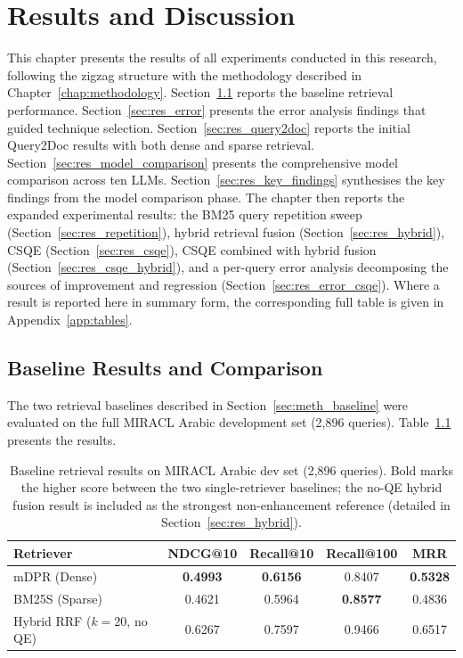 \chapter{Results and Discussion}
\label{chap:results}

This chapter presents the results of all experiments conducted in this research, following the zigzag structure with the methodology described in Chapter~\ref{chap:methodology}. Section~\ref{sec:res_baseline} reports the baseline retrieval performance. Section~\ref{sec:res_error} presents the error analysis findings that guided technique selection. Section~\ref{sec:res_query2doc} reports the initial Query2Doc results with both dense and sparse retrieval. Section~\ref{sec:res_model_comparison} presents the comprehensive model comparison across ten LLMs. Section~\ref{sec:res_key_findings} synthesises the key findings from the model comparison phase. The chapter then reports the expanded experimental results: the BM25 query repetition sweep (Section~\ref{sec:res_repetition}), hybrid retrieval fusion (Section~\ref{sec:res_hybrid}), CSQE (Section~\ref{sec:res_csqe}), CSQE combined with hybrid fusion (Section~\ref{sec:res_csqe_hybrid}), and a per-query error analysis decomposing the sources of improvement and regression (Section~\ref{sec:res_error_csqe}). Where a result is reported here in summary form, the corresponding full table is given in Appendix~\ref{app:tables}.

\section{Baseline Results and Comparison}
\label{sec:res_baseline}

The two retrieval baselines described in Section~\ref{sec:meth_baseline} were evaluated on the full MIRACL Arabic development set (2,896 queries). Table~\ref{tab:baseline_results} presents the results.

\begin{table}[htbp]
    \centering
    \caption[Baseline retrieval results]{Baseline retrieval results on MIRACL Arabic dev set (2,896 queries). Bold marks the higher score between the two single-retriever baselines; the no-QE hybrid fusion result is included as the strongest non-enhancement reference (detailed in Section~\ref{sec:res_hybrid}).}
    \label{tab:baseline_results}
    \begin{tabular}{@{}lcccc@{}}
        \toprule
        \textbf{Retriever} & \textbf{NDCG@10} & \textbf{Recall@10} & \textbf{Recall@100} & \textbf{MRR} \\
        \midrule
        mDPR (Dense) & \textbf{0.4993} & \textbf{0.6156} & 0.8407 & \textbf{0.5328} \\
        BM25S (Sparse) & 0.4621 & 0.5964 & \textbf{0.8577} & 0.4836 \\
        \midrule
        Hybrid RRF ($k=20$, no QE) & 0.6267 & 0.7597 & 0.9466 & 0.6517 \\
        \bottomrule
    \end{tabular}
\end{table}

